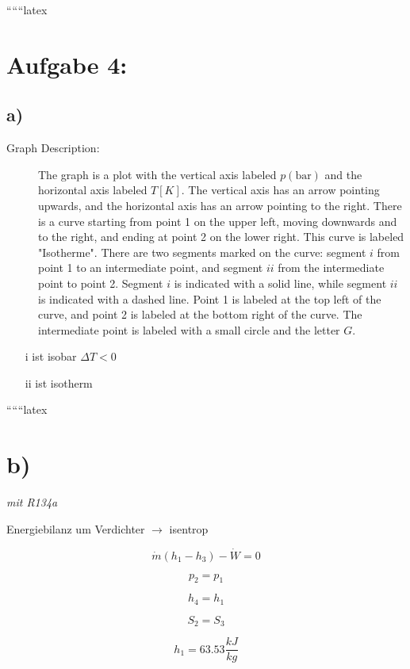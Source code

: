 
``````latex


\section*{Aufgabe 4:}

\subsection*{a)}

\begin{description}
    \item[Graph Description:] The graph is a plot with the vertical axis labeled \( p(\text{bar}) \) and the horizontal axis labeled \( T [K] \). The vertical axis has an arrow pointing upwards, and the horizontal axis has an arrow pointing to the right. There is a curve starting from point 1 on the upper left, moving downwards and to the right, and ending at point 2 on the lower right. This curve is labeled "Isotherme". There are two segments marked on the curve: segment \( i \) from point 1 to an intermediate point, and segment \( ii \) from the intermediate point to point 2. Segment \( i \) is indicated with a solid line, while segment \( ii \) is indicated with a dashed line. Point 1 is labeled at the top left of the curve, and point 2 is labeled at the bottom right of the curve. The intermediate point is labeled with a small circle and the letter \( G \).
\end{description}

\begin{itemize}
    \item[i] ist isobar \(\Delta T < 0\)
    \item[ii] ist isotherm
\end{itemize}

``````latex


\section*{b)}

\textit{mit R134a}

Energiebilanz um Verdichter $\rightarrow$ isentrop

\[
\dot{m} (h_1 - h_3) - \dot{W} = 0
\]

\[
p_2 = p_1
\]

\[
h_4 = h_1
\]

\[
S_2 = S_3
\]

\[
h_1 = 63.53 \frac{kJ}{kg}
\]

